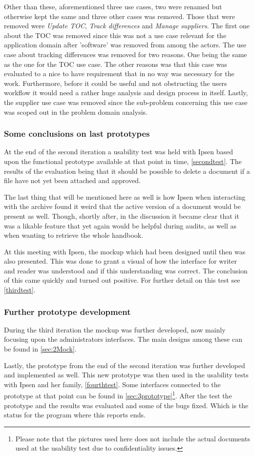 Other than these, aforementioned three use cases, two were renamed but otherwise kept the same and three other cases was removed.
Those that were removed were \textit{Update TOC}, \textit{Track differences} and \textit{Manage suppliers}.
The first one about the TOC was removed since this was not a use case relevant for the application domain after 'software' was removed from among the actors.
The use case about tracking differences was removed for two reasons.
One being the same as the one for the TOC use case.
The other reasons was that this case was evaluated to a nice to have requirement that in no way was necessary for the work.
Furthermore, before it could be useful and not obstructing the users workflow it would need a rather huge analysis and design process in itself.
Lastly, the supplier use case was removed since the sub-problem concerning this use case was scoped out in the problem domain analysis.

\subsubsection*{Some conclusions on last prototypes}
At the end of the second iteration a usability test was held with Ipsen based upon the functional prototype available at that point in time, \cref{secondtest}.
The results of the evaluation being that it should be possible to delete a document if a file have not yet been attached and approved.

The last thing that will be mentioned here as well is how Ipsen when interacting with the archive found it weird that the active version of a document would be present as well.
Though, shortly after, in the discussion it became clear that it was a likable feature that yet again would be helpful during audits, as well as when wanting to retrieve the whole handbook.

At this meeting with Ipsen, the mockup which had been designed until then was also presented.
This was done to grant a visual of how the interface for writer and reader was understood and if this understanding was correct.
The conclusion of this came quickly and turned out positive.
For further detail on this test see \cref{thirdtest}.


\subsubsection*{Further prototype development}
During the third iteration the mockup was further developed, now mainly focusing upon the administrators interfaces.
The main designs among these can be found in \cref{sec:2Mock}.

Lastly, the prototype from the end of the second iteration was further developed and implemented as well.
This new prototype was then used in the usability tests with Ipsen and her family, \cref{fourthtest}.
Some interfaces connected to the prototype at that point can be found in \cref{sec:3prototype}\footnote{Please note that the pictures used here does not include the actual documents used at the usability test due to confidentiality issues.}.
After the test the prototype and the results was evaluated and some of the bugs fixed.
Which is the status for the program where this reports ends.
